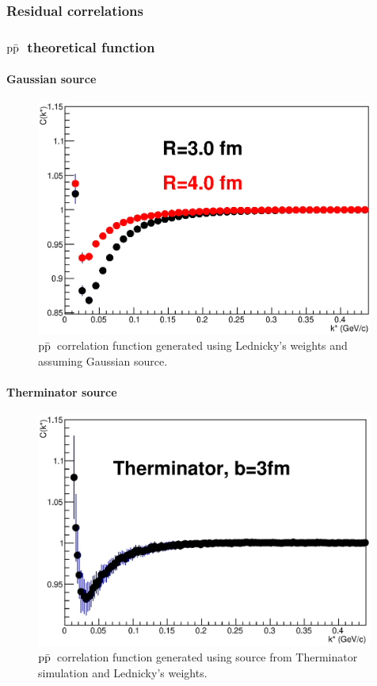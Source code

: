 \documentclass[ALICE,manyauthors]{ALICE_analysis_notes}
\newcommand{\pap}{$\rm p\bar{\rm p}$}
\begin{document}
\subsubsection{Residual correlations}

\subsubsection{\pap~theoretical function}

\paragraph{Gaussian source}

\begin{figure}[]
   \centering
   \includegraphics[width=0.99\textwidth]{pics/pap.eps}
   \caption{\pap~correlation function generated using Lednicky's weights and assuming Gaussian source.}
   \label{fig:cfpapgaus}
 \end{figure}

\paragraph{Therminator source}

\begin{figure}[]
   \centering
   \includegraphics[width=0.99\textwidth]{pics/paptherm.eps}
   \caption{\pap~correlation function generated using source from Therminator simulation and Lednicky's weights.}
   \label{fig:cfpaptherm}
 \end{figure}
\end{document}
